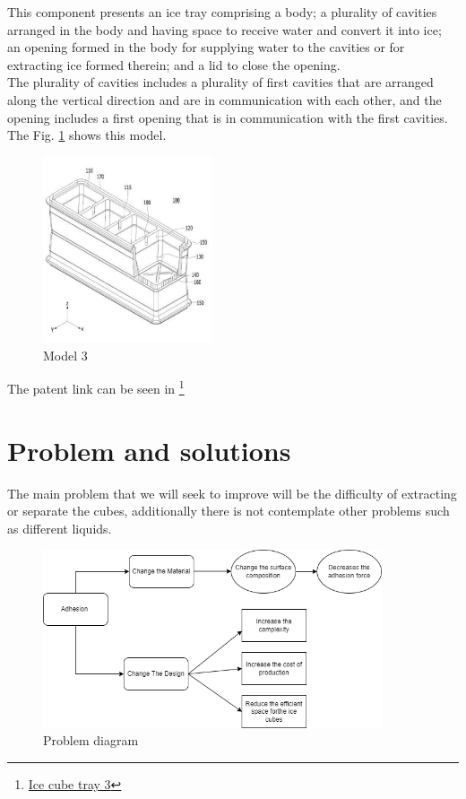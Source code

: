\documentclass[12pt, twoside]{report}
\begin{document}
\begin{itemize}
This component presents an ice tray comprising a body; a plurality of cavities arranged in the body and having space to receive water and convert it into ice; an opening formed in the body for supplying water to the cavities or for extracting ice formed therein; and a lid to close the opening.\\
The plurality of cavities includes a plurality of first cavities that are arranged along the vertical direction and are in communication with each other, and the opening includes a first opening that is in communication with the first cavities. The Fig. \ref{fig:model3} shows this model.

\begin{figure}[H]
    \centering
    \includegraphics[width=50mm,scale=0.5]{images/Project2/innovation3.png}
    \caption{Model 3}
    \label{fig:model3}
\end{figure}
The patent link can be seen in \footnote{\href{https://data.inpi.fr/brevets/WO2022225130}{Ice cube tray 3}}

    
\end{itemize}


\section{Problem and solutions}

The main problem that we will seek to improve will be the difficulty of extracting or separate the cubes, additionally there is not contemplate other problems such as different liquids.\\
\begin{figure}[H]
    \centering
    \includegraphics[width=100mm,scale=0.8]{images/EXERCISE_2/iccubes.drawio.png}
    \caption{Problem diagram}
    \label{fig:problem_Diagram}
\end{figure}
\end{document}
